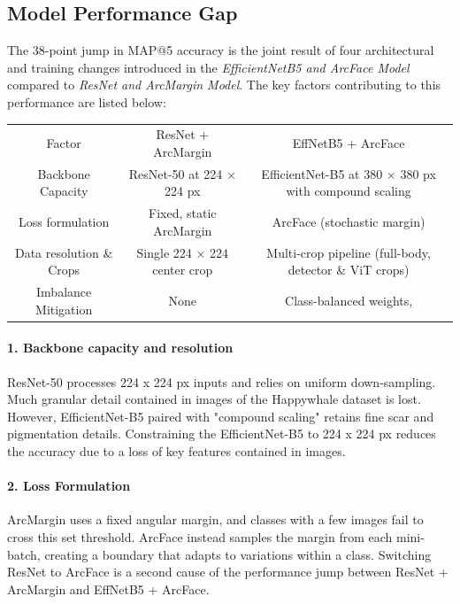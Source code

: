 \documentclass[twocolumn]{article}
\begin{document}
\subsection{Model Performance Gap}

The 38-point jump in MAP@5 accuracy is the joint result of four architectural and training changes introduced in the \textit{EfficientNetB5 and ArcFace Model} compared to \textit{ResNet and ArcMargin Model}. The key factors contributing to this performance are listed below:

\begin{table}
    \centering
    \begin{tabular}{ccc}
         Factor&  ResNet + ArcMargin& EffNetB5 +  ArcFace\\
         Backbone Capacity&  ResNet-50 at 224 × 224 px& EfficientNet-B5 at 380 × 380 px with compound scaling\\
         Loss formulation&  Fixed, static ArcMargin&  ArcFace (stochastic margin)\\
         Data resolution \& Crops&  Single 224 × 224 center crop& Multi-crop pipeline (full-body, detector \& ViT crops)\\
         Imbalance Mitigation&  None& Class-balanced weights,\\
    \end{tabular}
    \label{tab:my_label}
\end{table}

\paragraph{1. Backbone capacity and resolution}

ResNet-50 processes 224 x 224 px inputs and relies on uniform down-sampling. Much granular detail contained in images of the Happywhale dataset is lost. However, EfficientNet-B5 paired with "compound scaling" retains fine scar and pigmentation details. Constraining the EfficientNet-B5 to 224 x 224 px reduces the accuracy due to a loss of key features contained in images. 

\paragraph{2. Loss Formulation}

ArcMargin uses a fixed angular margin, and classes with a few images fail to cross this set threshold. ArcFace instead samples the margin from each mini-batch, creating a boundary that adapts to variations within a class. Switching ResNet to ArcFace is a second cause of the performance jump between ResNet + ArcMargin and EffNetB5 + ArcFace.
\end{document}
